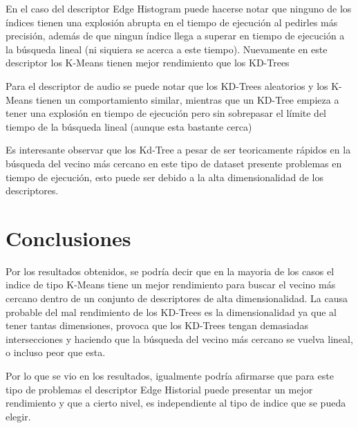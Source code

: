 \documentclass{article}
\begin{document}
	En el caso del descriptor Edge Histogram puede hacerse notar que ninguno de los índices tienen una explosión abrupta en el tiempo de ejecución al pedirles más precisión, además de que ningun índice llega a superar en tiempo de ejecución a la búsqueda lineal (ni siquiera se acerca a este tiempo). Nuevamente en este descriptor los K-Means tienen mejor rendimiento que los KD-Trees
	
	Para el descriptor de audio se puede notar que los KD-Trees aleatorios y los K-Means tienen un comportamiento similar, mientras que un KD-Tree empieza a tener una explosión en tiempo de ejecución pero sin sobrepasar el límite del tiempo de la búsqueda lineal (aunque esta bastante cerca)
	
	Es interesante observar que los Kd-Tree a pesar de ser teoricamente rápidos en la búsqueda del vecino más cercano en este tipo de dataset presente problemas en tiempo de ejecución, esto puede ser debido a la alta dimensionalidad de los descriptores.
	
	\section{Conclusiones}
	Por los resultados obtenidos, se podría decir que en la mayoria de los casos el indice de tipo K-Means tiene un mejor rendimiento para buscar el vecino más cercano dentro de un conjunto de descriptores de alta dimensionalidad. La causa probable del mal rendimiento de los KD-Trees es la dimensionalidad ya que al tener tantas dimensiones, provoca que los KD-Trees tengan demasiadas intersecciones y haciendo que la búsqueda del vecino más cercano se vuelva lineal, o incluso peor que esta.
	
	Por lo que se vio en los resultados, igualmente podría afirmarse que para este tipo de problemas el descriptor Edge Historial puede presentar un mejor rendimiento y que a cierto nivel, es independiente al tipo de indice que se pueda elegir.
\end{document}
